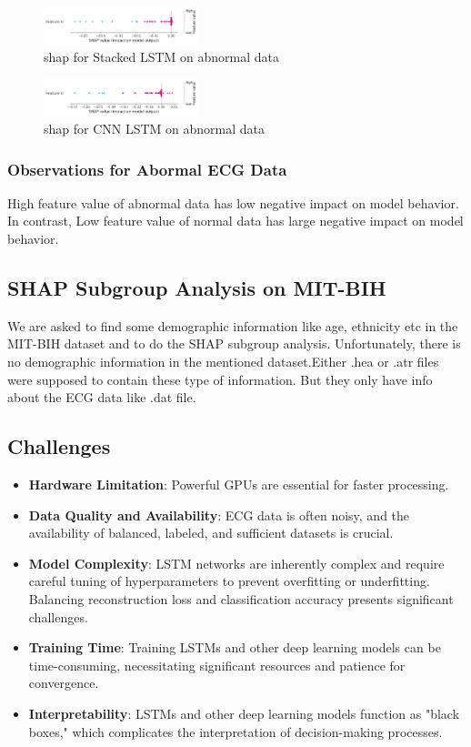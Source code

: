 \documentclass[nonacm,sigconf]{acmart}
\begin{document}
\begin{figure}
        \centering
        \includegraphics[width=0.4\textwidth]{shap/neg1.png}
        \caption{shap for Stacked LSTM on abnormal data}
        \label{fig:image1}
    \end{figure}%


\begin{figure}
        \centering
        \includegraphics[width=0.4\textwidth]{shap/neg3.png}
        \caption{shap for CNN LSTM on abnormal data}
        \label{fig:image1}
    \end{figure}%
\subsubsection{\textbf{Observations for Abormal ECG Data}} High feature value of  abnormal data has low negative impact on model behavior. In contrast, Low feature value of  normal data has large negative impact on model behavior.
\subsection{\textbf{SHAP Subgroup Analysis on MIT-BIH}}
We are asked to find some demographic information like age, ethnicity etc in the MIT-BIH dataset and to do the SHAP subgroup analysis. Unfortunately, there is no demographic information in the mentioned dataset.Either .hea or .atr files were supposed to contain these type of information. But they only have info about the ECG data like .dat file.

\subsection{Challenges}
\begin{itemize}
    \item \textbf{Hardware Limitation}: Powerful GPUs are essential for faster processing.
    \item \textbf{Data Quality and Availability}: ECG data is often noisy, and the availability of balanced, labeled, and sufficient datasets is crucial.
    \item \textbf{Model Complexity}: LSTM networks are inherently complex and require careful tuning of hyperparameters to prevent overfitting or underfitting. Balancing reconstruction loss and classification accuracy presents significant challenges.
    \item \textbf{Training Time}: Training LSTMs and other deep learning models can be time-consuming, necessitating significant resources and patience for convergence.
    \item \textbf{Interpretability}: LSTMs and other deep learning models function as "black boxes," which complicates the interpretation of decision-making processes.
\end{itemize}
\end{document}
